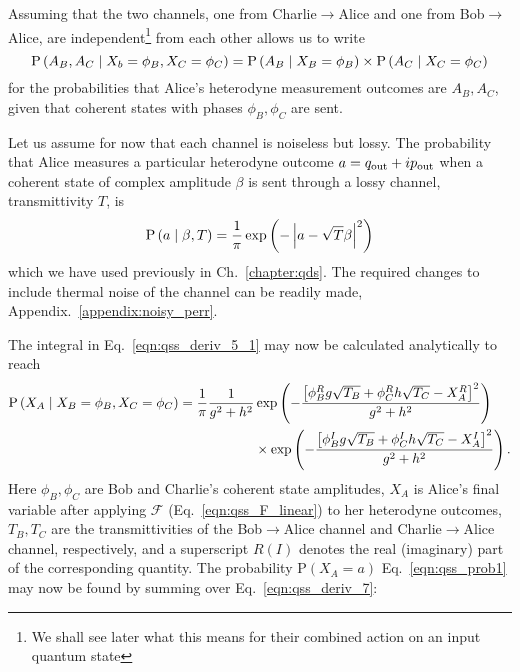 Assuming that the two channels, one from Charlie$\rightarrow$Alice and one from Bob$\rightarrow$Alice, are independent\footnote{We shall see later what this means for their combined action on an input quantum state} from each other allows us to write
\begin{equation}\label{eqn:qss_deriv_6}
\text{P}\left(A_B, A_C \; \middle| \; X_b=\phi_B, X_C=\phi_C\right) = \text{P}\left(A_B \; \middle| \; X_B=\phi_B\right) \times \text{P}\left(A_C \; \middle| \; X_C=\phi_C\right)
\end{equation}
for the probabilities that Alice's heterodyne measurement outcomes are $A_B, A_C$, given that coherent states with phases $\phi_B, \phi_C$ are sent.

Let us assume for now that each channel is noiseless but lossy. The probability that Alice measures a particular heterodyne outcome $a = q_{\text{out}} + i p_{\text{out}}$ when a coherent state of complex amplitude $\beta$ is sent through a lossy channel, transmittivity $T$, is  %
\begin{equation}\label{eqn:qss_channel_classical_prob}
\text{P}\left(a \; \middle| \; \beta, T\right) = \frac{1}{\pi}\exp\left( - \left| a - \sqrt{T}\beta \right|^2\right)
\end{equation}
which we have used previously in Ch.~\ref{chapter:qds}. The required changes to include thermal noise of the channel can be readily made, Appendix.~\ref{appendix:noisy_perr}.

The integral in Eq.~\ref{eqn:qss_deriv_5_1} may now be calculated analytically to reach 
\begin{align}\label{eqn:qss_deriv_7}
\text{P}\left(X_A \given X_B=\phi_B, X_C=\phi_C\right) = \frac{1}{\pi} \frac{1}{g^2 + h^2} &\exp \left( - \frac{\left[\phi_B^R g \sqrt{T_B} + \phi_C^R h \sqrt{T_C} - X_A^R \right]^2}{g^2 + h^2}\right) \notag \\
%
&\times \exp \left( - \frac{\left[\phi_B^I g \sqrt{T_B} + \phi_C^I h \sqrt{T_C} - X_A^I \right]^2}{g^2 + h^2} \right).
\end{align}
Here $\phi_B, \phi_C$ are Bob and Charlie's coherent state amplitudes, $X_A$ is Alice's final variable after applying $\mathcal{F}$ (Eq.~\ref{eqn:qss_F_linear}) to her heterodyne outcomes, $T_B, T_C$ are the transmittivities of the Bob$\rightarrow$Alice channel and Charlie$\rightarrow$Alice channel, respectively, and a superscript $R\left(I\right)$ denotes the real (imaginary) part of the corresponding quantity. %
The probability $\text{P}\left(X_A=a\right)$ Eq.~\ref{eqn:qss_prob1} may now be found by summing over Eq.~\ref{eqn:qss_deriv_7}:

